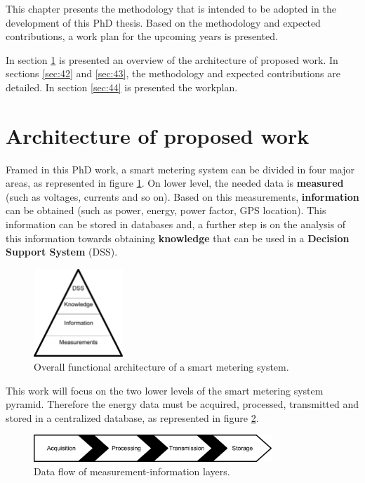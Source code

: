 
This chapter presents the methodology that is intended to be adopted in the development of this PhD thesis. Based on the methodology and expected contributions, a work plan for the upcoming years is presented.

In section \ref{sec:41} is presented an overview of the architecture of proposed work. In sections \ref{sec:42} and \ref{sec:43}, the methodology and expected contributions are detailed.
In section \ref{sec:44} is presented the workplan.

\section{Architecture of proposed work}
\label{sec:41}


Framed in this PhD work, a smart metering system can be divided in four major areas, as represented in figure \ref{fig:41topLevel}. On lower level, the needed data is \textbf{measured} (such as voltages, currents and so on).
Based on this measurements, \textbf{information} can be obtained (such as power, energy, power factor, GPS location).
This information can be stored in databases and, a further step is on the analysis of this information towards obtaining \textbf{knowledge} that can be used in a \textbf{Decision Support System} (DSS).

\begin{figure}[h!]
	\centering
	\vspace{-1em}
	\includegraphics[width=0.3\textwidth,keepaspectratio]{figures/4.Method/pyramid}
	\caption{Overall functional architecture of a smart metering system.}
	\label{fig:41topLevel}
\end{figure}

This work will focus on the two lower levels of the smart metering system pyramid. 
Therefore the energy data must be acquired, processed, transmitted and stored in a centralized database, as represented in figure \ref{fig:41dataFlow}.

\begin{figure}[h!]
	\centering
	\includegraphics[width=0.8\textwidth,keepaspectratio]{figures/4.Method/data_flow}
	\caption{Data flow of measurement-information layers.}
	\label{fig:41dataFlow}
\end{figure}


